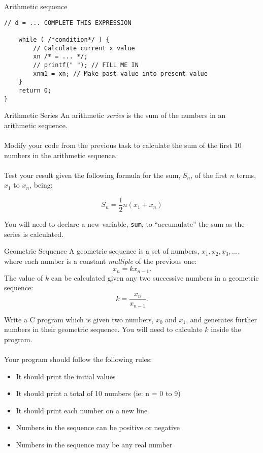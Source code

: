 \documentclass{lab}
\begin{document}
\begin{task}{Arithmetic sequence}{}
\begin{lstlisting}[style=pseudo]
	// d = ... COMPLETE THIS EXPRESSION

	while ( /*condition*/ ) {
		// Calculate current x value
		xn /* = ... */;
		// printf(" ");	// FILL ME IN			
		xnm1 = xn; // Make past value into present value
	}	
	return 0;
}
\end{lstlisting}
\end{task}

\begin{task}{Arithmetic Series}{}
An arithmetic \textit{series} is the sum of the numbers in an arithmetic sequence.
\\ \\
Modify your code from the previous task to calculate the sum of the first 10 numbers in the arithmetic sequence.
\\ \\
Test your result given the following formula for the sum, $S_n$, of the first $n$ terms, $x_1$ to $x_n$, being:

\begin{equation}
S_n = \frac{1}{2} n (x_1 + x_n)
\end{equation}

You will need to declare a new variable, \texttt{sum}, to ``accumulate'' the sum as the series is calculated.
\end{task}

\begin{task}{Geometric Sequence}{}
A geometric sequence is a set of numbers, $x_1, x_2, x_3, ...$, where each number is a constant \textit{multiple} of the previous one:
\begin{equation}
x_{n} = kx_{n-1}.
\end{equation}
The value of $k$ can be calculated given any two successive numbers in a geometric sequence:
\begin{equation}
k = \frac{x_{n}}{x_{n-1}}.
\end{equation}

Write a C program which is given two numbers, $x_0$ and $x_1$, and generates further numbers in their geometric sequence. You will need to calculate $k$ inside the program.
\\ \\
Your program should follow the following rules:
\begin{itemize}
\item It should print the initial values
\item It should print a total of 10 numbers (ie: n = 0 to 9)
\item It should print each number on a new line
\item Numbers in the sequence can be positive or negative
\item Numbers in the sequence may be any real number
\end{itemize}
\end{task}
\end{document}
